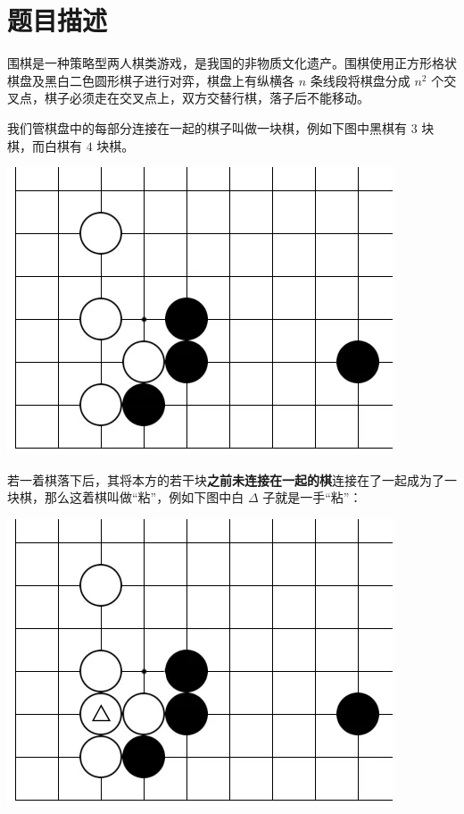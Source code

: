 \documentclass{ctpro}
\begin{document}
\makeproblem
\section*{题目描述}
围棋是一种策略型两人棋类游戏，是我国的非物质文化遗产。围棋使用正方形格状棋盘及黑白二色圆形棋子进行对弈，棋盘上有纵横各 $n$ 条线段将棋盘分成 $n^2$ 个交叉点，棋子必须走在交叉点上，双方交替行棋，落子后不能移动。

我们管棋盘中的每部分连接在一起的棋子叫做一块棋，例如下图中黑棋有 $3$ 块棋，而白棋有 $4$ 块棋。

\begin{center}
	\includegraphics[scale=0.5]{images/go_1.png}
\end{center}

若一着棋落下后，其将本方的若干块\textbf{之前未连接在一起的棋}连接在了一起成为了一块棋，那么这着棋叫做“粘”，例如下图中白 $\Delta$ 子就是一手“粘”：

\begin{center}
	\includegraphics[scale=0.5]{images/go_2.png}
\end{center}
\end{document}
